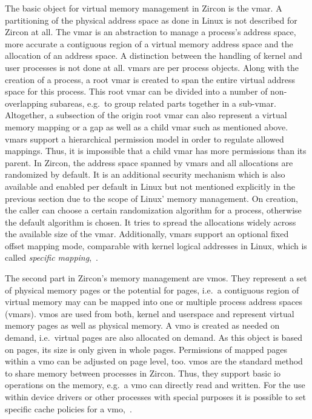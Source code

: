 The basic object for virtual memory management in Zircon is the \acl{vmar}.
A partitioning of the physical address space as done in Linux is not described for Zircon at all.
The \ac{vmar} is an abstraction to manage a process's address space, more accurate a contiguous region of a virtual memory address space and the allocation of an address space.
A distinction between the handling of kernel and user processes is not done at all.
\acp{vmar} are per process objects.
Along with the creation of a process, a root \ac{vmar} is created to span the entire virtual address space for this process.
This root \ac{vmar} can be divided into a number of non-overlapping subareas, e.g.\ to group related parts together in a sub-\ac{vmar}.
Altogether, a subsection of the origin root \ac{vmar} can also represent a virtual memory mapping or a gap as well as a child \ac{vmar} such as mentioned above.
\acp{vmar} support a hierarchical permission model in order to regulate allowed mappings.
Thus, it is impossible that a child \ac{vmar} has more permissions than its parent.
In Zircon, the address space spanned by \acp{vmar} and all allocations are randomized by default.
It is an additional security mechanism which is also available and enabled per default in Linux but not mentioned explicitly in the previous section due to the scope of Linux' memory management.
On creation, the caller can choose a certain randomization algorithm for a process, otherwise the default algorithm is chosen.
It tries to spread the allocations widely across the available size of the \ac{vmar}.
Additionally, \acp{vmar} support an optional fixed offset mapping mode, comparable with kernel logical addresses in Linux, which is called \textit{specific mapping}\cite{zircon-concepts},~\cite{zircon-vmar}.

The second part in Zircon's memory management are \acfp{vmo}.
They represent a set of physical memory pages or the potential for pages, i.e.\ a contiguous region of virtual memory may can be mapped into one or multiple process address spaces (\acp{vmar}).
\acp{vmo} are used from both, kernel and userspace and represent virtual memory pages as well as physical memory.
A \ac{vmo} is created as needed on demand, i.e.\ virtual pages are also allocated on demand.
As this object is based on pages, its size is only given in whole pages.
Permissions of mapped pages within a \ac{vmo} can be adjusted on page level, too.
\acp{vmo} are the standard method to share memory between processes in Zircon.
Thus, they support basic \ac{io} operations on the memory, e.g.\ a \ac{vmo} can directly read and written.
For the use within device drivers or other processes with special purposes it is possible to set specific cache policies for a \ac{vmo}\cite{zircon-concepts},~\cite{zircon-vmo}.



